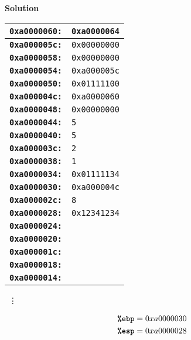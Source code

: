 \documentclass[11pt]{article}
\newenvironment{solution}{\begin{mdframed}\textbf{Solution}}{\end{mdframed}}
\begin{document}
\begin{solution}\\
\begin{doublespacing}
\begin{center}
\begin{minipage}{.8\textwidth}
\begin{tabular}{ |r|>{\centering\arraybackslash}p{}| }
\hline \textbf{\texttt{0xa0000060:}} & \texttt{0xa0000064} \\
\hline \textbf{\texttt{0xa000005c:}} & \texttt{0x00000000} \\
\hline \textbf{\texttt{0xa0000058:}} & \texttt{0x00000000} \\
\hline \textbf{\texttt{0xa0000054:}} & \texttt{0xa000005c} \\
\hline \textbf{\texttt{0xa0000050:}} & \texttt{0x01111100} \\
\hline \textbf{\texttt{0xa000004c:}} & \texttt{0xa0000060} \\
\hline \textbf{\texttt{0xa0000048:}} & \texttt{0x00000000} \\
\hline \textbf{\texttt{0xa0000044:}} & \texttt{5} \\
\hline \textbf{\texttt{0xa0000040:}} & \texttt{5} \\
\hline \textbf{\texttt{0xa000003c:}} & \texttt{2} \\
\hline \textbf{\texttt{0xa0000038:}} & \texttt{1} \\
\hline \textbf{\texttt{0xa0000034:}} & \texttt{0x01111134} \\
\hline \textbf{\texttt{0xa0000030:}} & \texttt{0xa000004c} \\
\hline \textbf{\texttt{0xa000002c:}} & \texttt{8} \\
\hline \textbf{\texttt{0xa0000028:}} & \texttt{0x12341234} \\
\hline \textbf{\texttt{0xa0000024:}} & \texttt{} \\
\hline \textbf{\texttt{0xa0000020:}} & \texttt{} \\
\hline \textbf{\texttt{0xa000001c:}} & \texttt{} \\
\hline \textbf{\texttt{0xa0000018:}} & \texttt{} \\
\hline \textbf{\texttt{0xa0000014:}} & \texttt{} \\
\hline
\end{tabular}
\end{minipage}
\end{center}
\end{doublespacing}
\begin{center}
\  \vdots
\end{center}
\begin{minipage}{.8\textwidth}
\begin{center}
\begin{align*}
\textbf{\texttt{\textrm{\texttt{\%ebp}}}} &= 0xa0000030 \\
\textbf{\texttt{\textrm{\texttt{\%esp}}}} &= 0xa0000028
\end{align*}
\end{center}
\end{minipage}
\end{solution}
\end{document}
